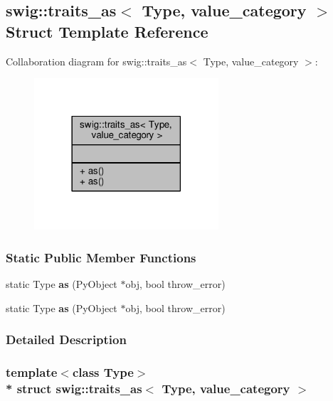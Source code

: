 \subsection{swig\+:\+:traits\+\_\+as$<$ Type, value\+\_\+category $>$ Struct Template Reference}
\label{structswig_1_1traits__as_3_01Type_00_01value__category_01_4}


Collaboration diagram for swig\+:\+:traits\+\_\+as$<$ Type, value\+\_\+category $>$\+:
\nopagebreak
\begin{figure}[H]
\begin{center}
\leavevmode
\includegraphics[width=194pt]{d3/d3e/structswig_1_1traits__as_3_01Type_00_01value__category_01_4__coll__graph}
\end{center}
\end{figure}
\subsubsection*{Static Public Member Functions}
\begin{DoxyCompactItemize}
\item 
static Type {\bf as} (Py\+Object $\ast$obj, bool throw\+\_\+error)
\item 
static Type {\bf as} (Py\+Object $\ast$obj, bool throw\+\_\+error)
\end{DoxyCompactItemize}


\subsubsection{Detailed Description}
\subsubsection*{template$<$class Type$>$\\*
struct swig\+::traits\+\_\+as$<$ Type, value\+\_\+category $>$}



